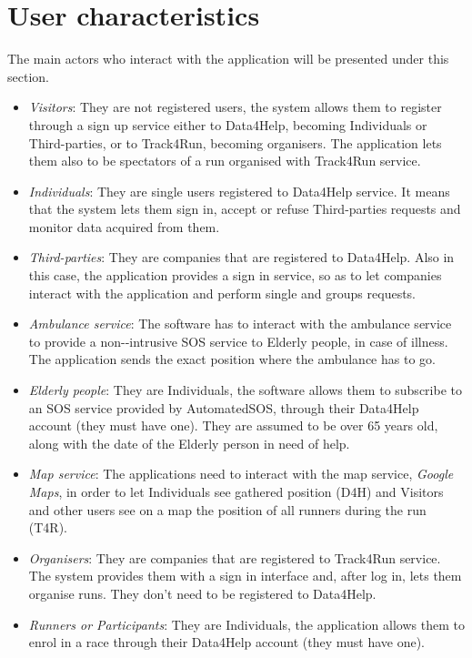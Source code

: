 \section{User characteristics}

The main actors who interact with the application will be presented under this section. 

\begin{itemize}
    \item \emph{Visitors}: They are not registered users, the system allows them to register through a sign up service either to Data4Help, becoming Individuals or Third-parties, or to Track4Run, becoming organisers. The application lets them also to be spectators of a run organised with Track4Run service. 
    \item \emph{Individuals}: They are single users registered to Data4Help service. It means that the system lets them sign in, accept or refuse Third-parties requests and monitor data acquired from them.
    \item \emph{Third-parties}: They are companies that are registered to Data4Help. Also in this case, the application provides a sign in service, so as to let companies interact with the application and perform single and groups requests. 
    \item \emph{Ambulance service}: The software has to interact with the ambulance service  to provide a non-‐intrusive SOS service to Elderly people, in case of illness. The application sends the exact position where the ambulance has to go.  
    \item \emph{Elderly people}: They are Individuals, the software allows them to subscribe to an SOS service provided by AutomatedSOS, through their Data4Help account (they must have one). They are assumed to be over 65 years old, along with the date of the Elderly person in need of help.
    \item \emph{Map service}: The applications need to interact with the map service, \emph{Google Maps}, in order to let Individuals see gathered position (D4H) and Visitors and other users see on a map the position of all runners during the run (T4R).
    \item \emph{Organisers}: They are companies that are registered to Track4Run service. The system provides them with a sign in interface and, after log in, lets them organise runs. They don't need to be registered to Data4Help.
    \item \emph{Runners or Participants}: They are Individuals, the application allows them to enrol in a race through their Data4Help account (they must have one).
\end{itemize}